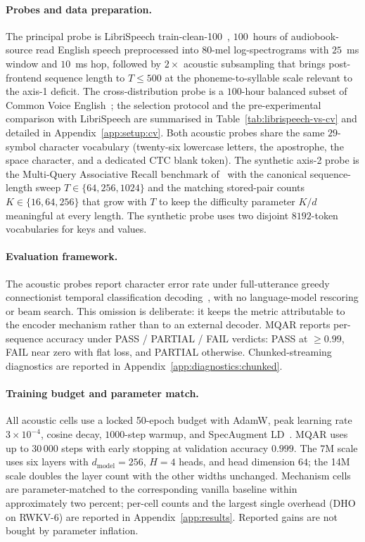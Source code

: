\paragraph{Probes and data preparation.} The principal probe is
LibriSpeech train-clean-100~\cite{panayotov2015librispeech},
$100$~hours of audiobook-source read English speech preprocessed
into $80$-mel log-spectrograms with $25$~ms window and $10$~ms
hop, followed by $2\times$ acoustic subsampling that brings
post-frontend sequence length to $T \le 500$ at the
phoneme-to-syllable scale relevant to the axis-1 deficit. The
cross-distribution probe is a $100$-hour balanced subset of
Common Voice English~\cite{ardila2019commonvoice}; the
selection protocol and the pre-experimental comparison with
LibriSpeech are summarised in
Table~\ref{tab:librispeech-vs-cv} and detailed in
Appendix~\ref{app:setup:cv}. Both acoustic probes share the same
$29$-symbol character vocabulary (twenty-six lowercase letters,
the apostrophe, the space character, and a dedicated CTC blank
token). The synthetic axis-2 probe is the Multi-Query
Associative Recall benchmark of~\citet{arora2023zoology} with
the canonical sequence-length sweep $T \in \{64, 256, 1024\}$
and the matching stored-pair counts $K \in \{16, 64, 256\}$ that
grow with $T$ to keep the difficulty parameter $K / d$
meaningful at every length. The synthetic probe uses two
disjoint $8192$-token vocabularies for keys and values.

\paragraph{Evaluation framework.} The acoustic probes report
character error rate under full-utterance greedy connectionist
temporal classification decoding~\cite{graves2006ctc}, with no
language-model rescoring or beam search. This omission is
deliberate: it keeps the metric attributable to the encoder
mechanism rather than to an external decoder. MQAR reports
per-sequence accuracy under PASS / PARTIAL / FAIL verdicts: PASS
at $\ge 0.99$, FAIL near zero with flat loss, and PARTIAL
otherwise. Chunked-streaming diagnostics are reported in
Appendix~\ref{app:diagnostics:chunked}.

\paragraph{Training budget and parameter match.} All acoustic
cells use a locked 50-epoch budget with AdamW, peak learning rate
$3 \times 10^{-4}$, cosine decay, $1000$-step warmup, and
SpecAugment LD~\cite{park2019specaugment}. MQAR uses up to
$30\,000$ steps with early stopping at validation accuracy
$0.999$. The 7M scale uses six layers with
$d_{\text{model}} = 256$, $H = 4$ heads, and head dimension $64$;
the 14M scale doubles the layer count with the other widths
unchanged. Mechanism cells are parameter-matched to the
corresponding vanilla baseline within approximately two percent;
per-cell counts and the largest single overhead (DHO on RWKV-6)
are reported in Appendix~\ref{app:results}. Reported gains are
not bought by parameter inflation.

